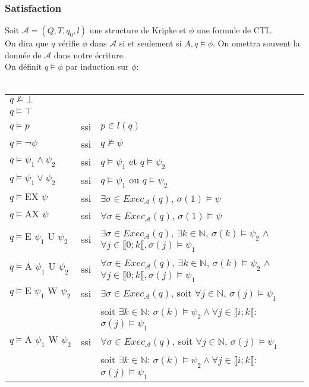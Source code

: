\documentclass[10pt,a4paper]{article}
\begin{document}
\subsubsection{Satisfaction}
Soit $\mathcal{A} = (Q,T,q_0,l)$ une structure de Kripke et $\phi$ une formule de CTL.\\
On dira que $q$ vérifie $\phi$ dans $\mathcal{A}$ si et seulement si $A, q \vDash \phi$. On omettra souvent la donnée de $\mathcal{A}$ dans notre écriture.\\
On définit $q \vDash \phi$ par induction sur $\phi$:\\
\\
\begin{tabular}{lcl}
$q \nvDash \bot$ &&\\
$q \vDash \top$ &&\\
$q \vDash p$ &ssi& $p \in l (q)$\\
$q \vDash \neg \psi$ &ssi& $q \nvDash \psi$\\
$q \vDash \psi_1 \land \psi_2$ &ssi& $q \vDash \psi_1$ et $q \vDash \psi_2$\\
$q \vDash \psi_1 \lor \psi_2$ &ssi& $q \vDash \psi_1$ ou $q \vDash \psi_2$\\
$q \vDash \mbox{EX } \psi$ &ssi& $\exists \sigma \in Exec_\mathcal{A}(q)$, $\sigma(1) \vDash \psi$\\
$q \vDash \mbox{AX } \psi$ &ssi& $\forall \sigma \in Exec_\mathcal{A}(q)$, $\sigma(1) \vDash \psi$\\

$q \vDash \mbox{E } \psi_1 \mbox{ U } \psi_2$ &ssi& $\exists \sigma \in Exec_\mathcal{A}(q)$, $\exists k \in \mathbb{N}$, $\sigma(k)\vDash \psi_2$ $\land$ $\forall j \in \llbracket 0; k\llbracket, \sigma(j)\vDash \psi_1$\\

$q \vDash \mbox{A } \psi_1 \mbox{ U } \psi_2$ &ssi& $\forall \sigma \in Exec_\mathcal{A}(q)$, $\exists k \in \mathbb{N}$, $\sigma(k)\vDash \psi_2$ $\land$ $\forall j \in \llbracket 0; k\llbracket, \sigma(j)\vDash \psi_1$\\

$q \vDash \mbox{E } \psi_1 \mbox{ W } \psi_2$ &ssi& $\exists \sigma \in Exec_\mathcal{A}(q)$, soit $\forall j \in \mathbb{N}$, $\sigma(j) \vDash \psi_1$\\
& & soit $\exists k\in \mathbb{N}$: $\sigma(k)\vDash \psi_2 \land \forall j \in \llbracket i; k \llbracket$: $\sigma(j) \vDash \psi_1$\\

$q \vDash \mbox{A } \psi_1 \mbox{ W } \psi_2$ &ssi& $\forall \sigma \in Exec_\mathcal{A}(q)$, soit $\forall j \in \mathbb{N}$, $\sigma(j) \vDash \psi_1$\\
& & soit $\exists k\in \mathbb{N}$: $\sigma(k)\vDash \psi_2 \land \forall j \in \llbracket i; k \llbracket$: $\sigma(j) \vDash \psi_1$\\
\end{tabular}
\end{document}
